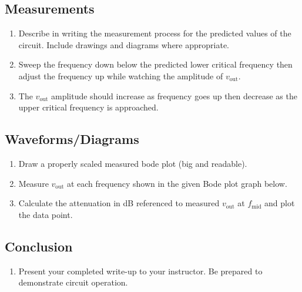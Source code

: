 \subsection{Measurements}
\label{sec:Measurements}
\begin{enumerate}
    \item Describe in writing the measurement process for the predicted values of the circuit. Include drawings and diagrams where appropriate.
    \item Sweep the frequency down below the predicted lower critical frequency then adjust the frequency up while watching the amplitude of $v_{\text{out}}$.
    \item The $v_{\text{out}}$ amplitude should increase as frequency goes up then decrease as the upper critical frequency is approached.
\end{enumerate}

\subsection{Waveforms/Diagrams}
\label{sec:Waveforms}
\begin{enumerate}
    \item Draw a properly scaled measured bode plot (big and readable).
    \item Measure $v_{\text{out}}$ at each frequency shown in the given Bode plot graph below.
    \item Calculate the attenuation in dB referenced to measured $v_{\text{out}}$ at $f_{\text{mid}}$ and plot the data point.
\end{enumerate}

\subsection{Conclusion}
\label{sec:Conclusion}
\begin{enumerate}
    \item Present your completed write-up to your instructor. Be prepared to demonstrate circuit operation.
\end{enumerate}
